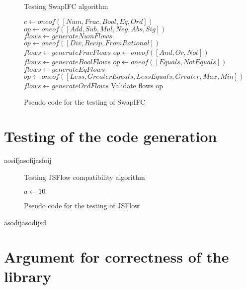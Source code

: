 \begin{figure}[h]
  \begin{algorithm}[H]
    \caption{Testing SwapIFC algorithm}
    \begin{algorithmic}
      \State $c\gets oneof([Num, Frac, Bool, Eq, Ord])$
          \State $op\gets oneof([Add, Sub, Mul, Neg, Abs, Sig])$
          \State $flows\gets generateNumFlows$
      \EndIf        
          \State $op\gets oneof([Div, Recip, FromRational])$
          \State $flows\gets generateFracFlows$
      \EndIf
          \State $op\gets oneof([And, Or, Not])$
          \State $flows\gets generateBoolFlows$
      \EndIf
          \State $op\gets oneof([Equals, NotEquals])$
          \State $flows\gets generateEqFlows$
      \EndIf
          \State $op\gets oneof([Less, GreaterEquals, LessEquals, Greater, Max, Min])$
          \State $flows\gets generateOrdFlows$
      \EndIf
      \State
      \State
      \Return Validate flows op
    \end{algorithmic}
  \end{algorithm}
  \caption{Pseudo code for the testing of SwapIFC}
  \label{fig:testing_swapifc}
\end{figure}

\section{Testing of the code generation}
aosifjasofijasfoij
\begin{figure}[h]
  \begin{algorithm}[H]
    \caption{Testing JSFlow compatibility algorithm}
    \begin{algorithmic}
         \State $a\gets 10$
      \EndIf
    \end{algorithmic}
  \end{algorithm}
  \caption{Pseudo code for the testing of JSFlow}
  \label{fig:testing_jsflow}
\end{figure}
asodijasodijsd

\section{Argument for correctness of the library}

